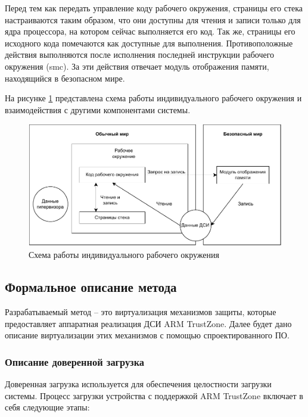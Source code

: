 Перед тем как передать управление коду рабочего окружения, страницы его стека настраиваются таким образом, что они доступны для чтения и записи только для ядра процессора, на котором сейчас выполняется его код. Так же, страницы его исходного кода помечаются как доступные для выполнения. Противоположные действия выполняются после исполнения последней инструкции рабочего окружения (smc). За эти действия отвечает модуль отображения памяти, находящийся в безопасном мире.

На рисунке \ref{fig:ciee} представлена схема работы индивидуального рабочего окружения и взаимодействия с другими компонентами системы.

\begin{figure}[h]
	\centering
	\includegraphics[width=\textwidth]{img/ciee.pdf}
	\caption{Схема работы индивидуального рабочего окружения}
	\label{fig:ciee}
\end{figure}

\subsection{Формальное описание метода}

Разрабатываемый метод -- это виртуализация механизмов защиты, которые предоставляет аппаратная реализация ДСИ ARM TrustZone. Далее будет дано описание виртуализации этих механизмов с помощью спроектированного ПО.

\subsubsection{Описание доверенной загрузка}

Доверенная загрузка используется для обеспечения целостности загрузки системы. Процесс загрузки устройства с поддержкой ARM TrustZone включает в себя следующие этапы:

